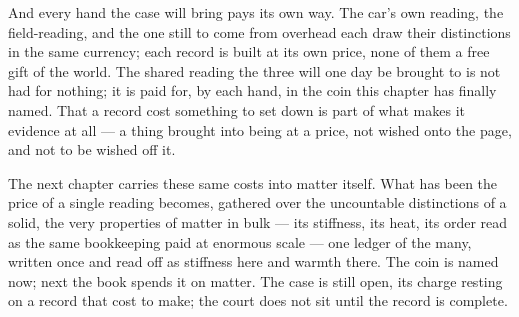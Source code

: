 And every hand the case will bring pays its own way. The car's own reading, the field-reading, and the one
still to come from overhead each draw their distinctions in the same currency; each record is built at its own
price, none of them a free gift of the world. The shared reading the three will one day be brought to is not
had for nothing; it is paid for, by each hand, in the coin this chapter has finally named. That a record cost
something to set down is part of what makes it evidence at all --- a thing brought into being at a price, not
wished onto the page, and not to be wished off it.

The next chapter carries these same costs into matter itself. What has been the price of a single reading
becomes, gathered over the uncountable distinctions of a solid, the very properties of matter in bulk --- its
stiffness, its heat, its order read as the same bookkeeping paid at enormous scale --- one ledger of the many,
written once and read off as stiffness here and warmth there. The coin is named now; next
the book spends it on matter. The case is still open, its charge resting on a record that cost to make; the
court does not sit until the record is complete.

